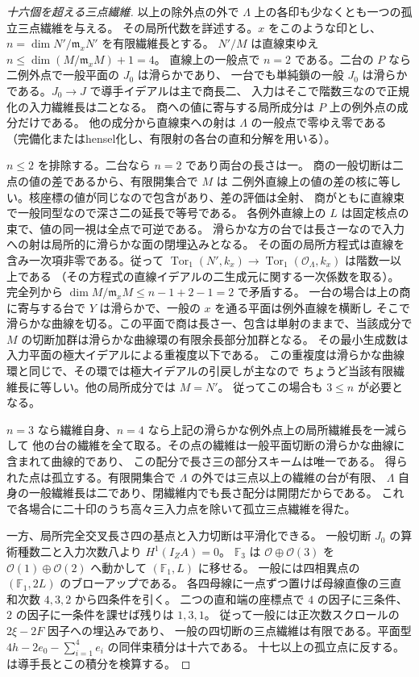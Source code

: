 \begin{proof}[十六個を超える三点繊維]
以上の除外点の外で $\Lambda$ 上の各印も少なくとも一つの孤立三点繊維を与える。
その局所代数を詳述する。$x$ をこのような印とし、$n=\dim N'/\mathfrak m_x N'$ を有限繊維長とする。
$N'/M$ は直線束ゆえ $n\le\dim(M/\mathfrak m_x M)+1=4$。
直線上の一般点で $n=2$ である。二台の $P$ なら二例外点で一般平面の $J_0$ は滑らかであり、
一台でも単純鎖の一般 $J_0$ は滑らかである。$J_0\to J$ で導手イデアルは主で商長二、
入力はそこで階数三なので正規化の入力繊維長は二となる。
商への値に寄与する局所成分は $P$ 上の例外点の成分だけである。
他の成分から直線束への射は $\Lambda$ の一般点で零ゆえ零である
（完備化またはhensel化し、有限射の各台の直和分解を用いる）。

$n\le2$ を排除する。二台なら $n=2$ であり両台の長さは一。
商の一般切断は二点の値の差であるから、有限開集合で $M$ は
二例外直線上の値の差の核に等しい。核座標の値が同じなので包含があり、差の評価は全射、
商がともに直線束で一般同型なので深さ二の延長で等号である。
各例外直線上の $L$ は固定核点の束で、値の同一視は全点で可逆である。
滑らかな方の台では長さ一なので入力への射は局所的に滑らかな面の閉埋込みとなる。
その面の局所方程式は直線を含み一次項非零である。従って
$\operatorname{Tor}_1(N',k_x)\to\operatorname{Tor}_1(\mathcal O_\Lambda,k_x)$ は階数一以上である
（その方程式の直線イデアルの二生成元に関する一次係数を取る）。
完全列から $\dim M/\mathfrak m_xM\le n-1+2-1=2$ で矛盾する。
一台の場合は上の商に寄与する台で $Y$ は滑らかで、一般の $x$ を通る平面は例外直線を横断し
そこで滑らかな曲線を切る。この平面で商は長さ一、包含は単射のままで、当該成分で
$M$ の切断加群は滑らかな曲線環の有限余長部分加群となる。
その最小生成数は入力平面の極大イデアルによる重複度以下である。
この重複度は滑らかな曲線環と同じで、その環では極大イデアルの引戻しが主なので
ちょうど当該有限繊維長に等しい。他の局所成分では $M=N'$。
従ってこの場合も $3\le n$ が必要となる。

$n=3$ なら繊維自身、$n=4$ なら上記の滑らかな例外点上の局所繊維長を一減らして
他の台の繊維を全て取る。その点の繊維は一般平面切断の滑らかな曲線に含まれて曲線的であり、
この配分で長さ三の部分スキームは唯一である。
得られた点は孤立する。有限開集合で $\Lambda$ の外では三点以上の繊維の台が有限、
$\Lambda$ 自身の一般繊維長は二であり、閉繊維内でも長さ配分は開閉だからである。
これで各場合に二十印のうち高々三入力点を除いて孤立三点繊維を得た。

一方、局所完全交叉長さ四の基点と入力切断は平滑化できる。
一般切断 $J_0$ の算術種数二と入力次数八より $H^1(I_Z A)=0$。
$\mathbb F_3$ は $\mathcal O\oplus\mathcal O(3)$ を
$\mathcal O(1)\oplus\mathcal O(2)$ へ動かして $(\mathbb F_1,L)$ に移せる。
一般には四相異点の $(\mathbb F_1,2L)$ のブローアップである。
各四母線に一点ずつ置けば母線直像の三直和次数 $4,3,2$ から四条件を引く。
二つの直和端の座標点で $4$ の因子に三条件、$2$ の因子に一条件を課せば残りは $1,3,1$。
従って一般には正次数スクロールの $2\xi-2F$ 因子への埋込みであり、
一般の四切断の三点繊維は有限である。平面型 $4h-2e_0-\sum_{i=1}^4e_i$ の同伴束積分は十六である。
十七以上の孤立点に反する。
は導手長とこの積分を検算する。
\end{proof}
